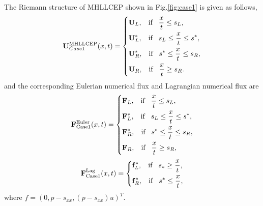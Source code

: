 \documentclass[review]{elsarticle}
\begin{document}
The Riemann structure of MHLLCEP  shown in Fig.\ref{fig:case1} is given as follows,
\begin{equation}\label{eq:HLLCEP}
  \mathbf{U}^{\text{MHLLCEP}}_{{Case1}}(x,t) = \left\{ \begin{aligned}
        & \mathbf{U}_L, \hspace{0.3cm} \text{if} \hspace{0.3cm} \frac{x}{t}\le s_L, \\
        & \mathbf{U}_L^*, \hspace{0.3cm} \text{if} \hspace{0.3cm} s_L\le \frac{x}{t} \le s^*, \\
        & \mathbf{U}_R^*, \hspace{0.3cm} \text{if} \hspace{0.3cm} s^*\le \frac{x}{t} \le s_R,\\
        & \mathbf{U}_R, \hspace{0.3cm} \text{if} \hspace{0.3cm} \frac{x}{t}\ge s_R. \\
      \end{aligned}
    \right.
  \end{equation}
  and the corresponding Eulerian numerical flux and Lagrangian numerical flux are
 \begin{equation}
    \mathbf{F}^{\text{Euler}}_{\text{Case1}}(x,t) = \left\{ \begin{aligned}
        & \mathbf{F}_L, \hspace{0.3cm} \text{if} \hspace{0.3cm} \frac{x}{t}\le s_L, \\
        & \mathbf{F}_L^*, \hspace{0.3cm} \text{if} \hspace{0.3cm} s_L\le \frac{x}{t} \le s^*, \\
        & \mathbf{F}_R^*, \hspace{0.3cm} \text{if} \hspace{0.3cm} s^*\le \frac{x}{t} \le s_R,\\
        & \mathbf{F}_R, \hspace{0.3cm} \text{if} \hspace{0.3cm} \frac{x}{t}\ge s_R, \\
      \end{aligned}
    \right.
  \end{equation}
\begin{equation}
    \mathbf{F}^{\text{Lag}}_{\text{Case1}}(x,t) = \left\{ \begin{aligned}
        & \mathbf{f}_L^*, \hspace{0.3cm} \text{if} \hspace{0.3cm} s_*\ge \frac{x}{t},\\
        & \mathbf{f}_R^*, \hspace{0.3cm} \text{if} \hspace{0.3cm} s^*\le \frac{x}{t},\\
      \end{aligned}
    \right.
  \end{equation}
where $f=(0,p-s_{xx},(p-s_{xx})u)^{T}$.
\end{document}
